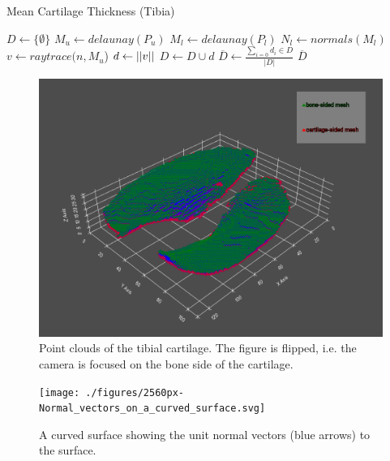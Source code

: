 \begin{algorithm}
	\caption{Mean Cartilage Thickness (Tibia)}
	\label{algo:tibialthickness}
	\begin{algorithmic}[1]
		\State $D \gets \{\emptyset\}$
		\State $M_{u} \gets delaunay(P_{u})$
		\State $M_{l} \gets delaunay(P_{l})$
		\State $N_{l} \gets normals(M_{l})$
			\State $v \gets raytrace(n, M_{u}$)
			\State $d \gets \lvert \lvert v \rvert \rvert$
			\State $D \gets D \cup d$
		\EndFor
		\State $\overline{D} \gets \frac{\sum_{i = 0} d_{i} \in D}{\lvert D \rvert}$
		\State
		\Return $\overline{D}$
		\EndProcedure
	\end{algorithmic}
\end{algorithm}
\begin{figure}[]
	\centering
	\includegraphics[width=\linewidth]{./figures/tibial_points}
	\caption{Point clouds of the tibial cartilage. The figure is flipped, i.e. the camera is focused on the bone side of the cartilage.}
	\label{fig:tibial_point_cloud}
\end{figure}
\begin{figure}[]
	\centering
	\texttt{[image: ./figures/2560px-Normal\_vectors\_on\_a\_curved\_surface.svg]}
	\caption{A curved surface showing the unit normal vectors (blue arrows) to the surface. \cite{surfacenormals}}
	\label{fig:surfacenormals}
\end{figure}
